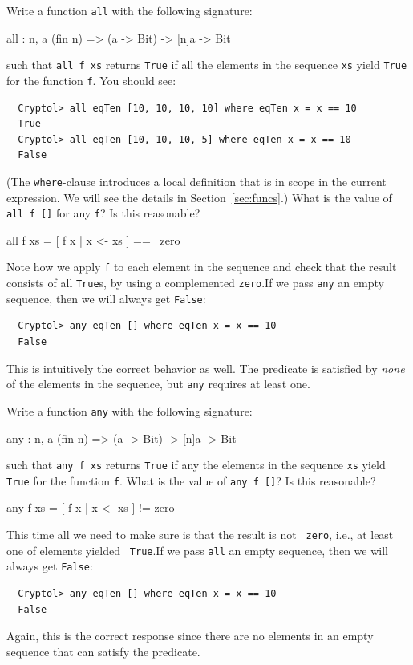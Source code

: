 \begin{Exercise}\label{ex:zero:1}
Write a function {\tt all} with the following signature:\indAll
\begin{code}
  all : {n, a} (fin n) => (a -> Bit) -> [n]a -> Bit
\end{code}
such that {\tt all f xs} returns {\tt True} if all the elements in the
sequence {\tt xs} yield {\tt True} for the function {\tt f}.
 You should see:
\begin{Verbatim}
  Cryptol> all eqTen [10, 10, 10, 10] where eqTen x = x == 10
  True
  Cryptol> all eqTen [10, 10, 10, 5] where eqTen x = x == 10
  False
\end{Verbatim}
(The {\tt where}-clause introduces a local definition that is in scope
in the current expression. We will see the details in
Section~\ref{sec:funcs}.\indWhere) What is the value of {\tt all f []}
for any {\tt f}? Is this reasonable?
\end{Exercise}
\begin{Answer}
\begin{code}
  all f xs = [ f x | x <- xs ] == ~zero
\end{code}
Note how we apply {\tt f} to each element in the sequence and check
that the result consists of all {\tt True}s, by using a complemented
{\tt zero}.\indZero\indAll If we pass {\tt any} an empty sequence,
then we will always get {\tt False}:
\begin{Verbatim}
  Cryptol> any eqTen [] where eqTen x = x == 10
  False
\end{Verbatim}
This is intuitively the correct behavior as well. The predicate is
satisfied by {\em none} of the elements in the sequence, but {\tt any}
requires at least one.
\end{Answer}

\begin{Exercise}\label{ex:zero:2}
Write a function {\tt any} with the following signature:\indAny
\begin{code}
  any : {n, a} (fin n) => (a -> Bit) -> [n]a -> Bit
\end{code}
such that {\tt any f xs} returns {\tt True} if any the elements in the
sequence {\tt xs} yield {\tt True} for the function {\tt f}. What is
the value of {\tt any f []}? Is this reasonable?
\end{Exercise}
\begin{Answer}
\begin{code}
  any f xs = [ f x | x <- xs ] != zero
\end{code}
This time all we need to make sure is that the result is not {\tt
  zero}, i.e., at least one of elements yielded {\tt
  True}.\indZero\indTrue\indAny If we pass {\tt all} an empty
sequence, then we will always get {\tt False}:
\begin{Verbatim}
  Cryptol> any eqTen [] where eqTen x = x == 10
  False
\end{Verbatim}
Again, this is the correct response since there are no elements in an
empty sequence that can satisfy the predicate.
\end{Answer}

